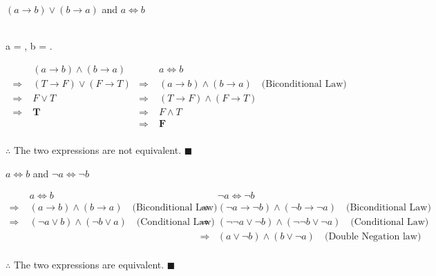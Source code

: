 \documentclass[]{article}
\begin{document}
\begin{question}
    $(a \rightarrow b) \lor (b \rightarrow a)$ and $a \iff b$
\end{question}
\begin{center}
         \\
         a = , b = . \\
\end{center}
\begin{align*}
    & (a \rightarrow b) \land (b \rightarrow a) & & a \iff b\\
    \Rightarrow\; & (T \rightarrow F) \lor (F \rightarrow T) & \Rightarrow\; & (a \rightarrow b) \land (b \rightarrow a) \quad \text{(Biconditional Law)}\\
    \Rightarrow\; & F \lor T & \Rightarrow\; &  (T \rightarrow F) \land (F \rightarrow T)\\
    \Rightarrow\; & \mathbf{T} & \Rightarrow\; & F \land T \\
    & &  \Rightarrow\; & \mathbf{F} \\
\end{align*}
\begin{center}
    $\therefore$ The two expressions are not equivalent. $\blacksquare$
\end{center}

\begin{question}
    $a \iff b$ and $\neg a \iff \neg b$
\end{question}
\begin{align*}
    & a \iff b & & \neg a \iff \neg b \\
    \Rightarrow\; & (a \rightarrow b) \land (b \rightarrow a) \quad \text{(Biconditional Law)} & \Rightarrow & (\neg a \rightarrow \neg b) \land (\neg b \rightarrow \neg a) \quad \text{(Biconditional Law)}\\
    \Rightarrow\; & (\neg a \lor b) \land (\neg b \lor a) \quad \text{(Conditional Law)} & \Rightarrow & (\neg\neg a \lor \neg b) \land (\neg\neg b \lor \neg a) \quad \text{(Conditional Law)}\\
    & & \Rightarrow & (a \lor \neg b) \land (b \lor \neg a) \quad \text{(Double Negation law)} \\
\end{align*}
\begin{center}
    $\therefore$ The two expressions are equivalent. $\blacksquare$
\end{center}
\end{document}
